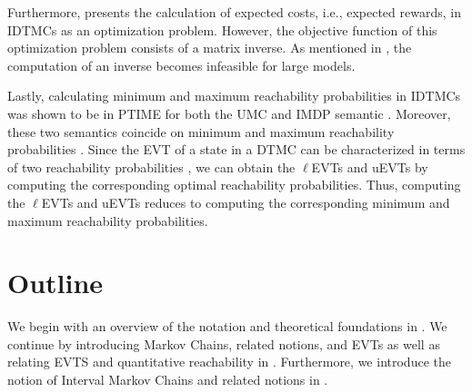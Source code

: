 
Furthermore, \cite{Teo_IMC_Performance_Measure_Master_Thesis} presents the calculation of expected costs, i.e., expected rewards, in IDTMCs as an optimization problem. However, the objective function of this optimization problem consists of a matrix inverse. As mentioned in \cite{Computing_EVTs_Stationary_Distr_in_MCs_Mertens}, the computation of an inverse becomes infeasible for large models.

Lastly, calculating minimum and maximum reachability probabilities in IDTMCs was shown to be in PTIME for both the UMC and IMDP semantic \cite{complexity_model_checking_interval-valued_DTMCs}. Moreover, these two semantics coincide on minimum and maximum reachability probabilities \cite{reachability_in_pIMCs_using_constraints,complexity_model_checking_interval-valued_DTMCs}. Since the EVT of a state in a DTMC can be characterized in terms of two reachability probabilities \cite{Baier_Relating_Reach_Prob,Computing_EVTs_Stationary_Distr_in_MCs_Mertens}, we can obtain the $\ell$EVTs and uEVTs by computing the corresponding optimal reachability probabilities. Thus, computing the $\ell$EVTs and uEVTs reduces to computing the corresponding minimum and maximum reachability probabilities.








\section{Outline}
We begin with an overview of the notation and theoretical foundations in . We continue by introducing Markov Chains, related notions, and EVTs as well as relating EVTS and quantitative reachability in . Furthermore, we introduce the notion of Interval Markov Chains and related notions in . 

